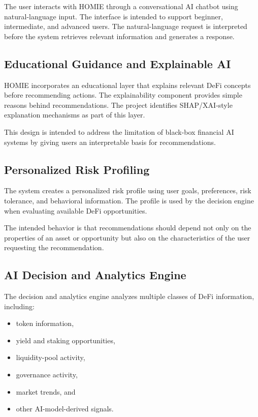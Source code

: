 \documentclass[conference]{IEEEtran}
\begin{document}
The user interacts with HOMIE through a conversational AI chatbot using natural-language input. The interface is intended to support beginner, intermediate, and advanced users. The natural-language request is interpreted before the system retrieves relevant information and generates a response.

\subsection{Educational Guidance and Explainable AI}

HOMIE incorporates an educational layer that explains relevant DeFi concepts before recommending actions. The explainability component provides simple reasons behind recommendations. The project identifies SHAP/XAI-style explanation mechanisms as part of this layer.

This design is intended to address the limitation of black-box financial AI systems by giving users an interpretable basis for recommendations.

\subsection{Personalized Risk Profiling}

The system creates a personalized risk profile using user goals, preferences, risk tolerance, and behavioral information. The profile is used by the decision engine when evaluating available DeFi opportunities.

The intended behavior is that recommendations should depend not only on the properties of an asset or opportunity but also on the characteristics of the user requesting the recommendation.

\subsection{AI Decision and Analytics Engine}

The decision and analytics engine analyzes multiple classes of DeFi information, including:
\begin{itemize}
    \item token information,
    \item yield and staking opportunities,
    \item liquidity-pool activity,
    \item governance activity,
    \item market trends, and
    \item other AI-model-derived signals.
\end{itemize}
\end{document}
